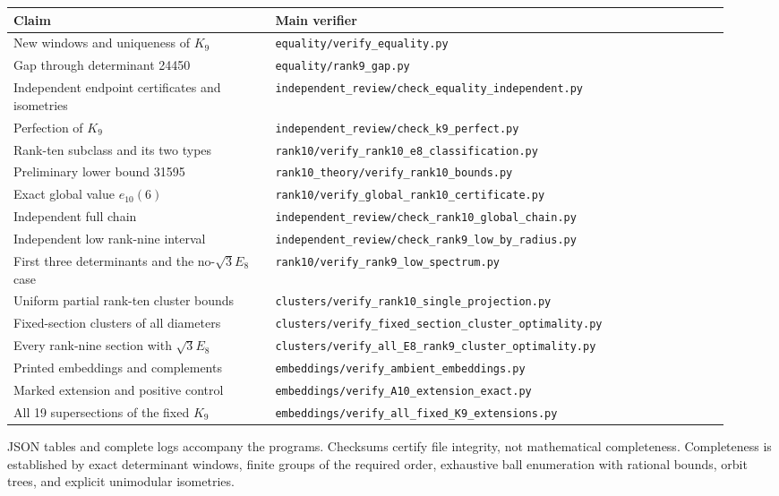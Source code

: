 \documentclass[11pt,a4paper]{article}
\theoremstyle{remark}\newtheorem{remark}[theorem]{Remark}
\newcommand{\file}[1]{{\small\nolinkurl{#1}}}
\begin{document}
\begin{longtable}{P{0.34\linewidth}P{0.59\linewidth}}
\toprule
Claim & Main verifier\\\midrule
\endhead
New windows and uniqueness of $K_9$ &\file{equality/verify_equality.py}\\[3pt]
Gap through determinant 24450 &\file{equality/rank9_gap.py}\\[3pt]
Independent endpoint certificates and isometries &\file{independent_review/check_equality_independent.py}\\[3pt]
Perfection of $K_9$ &\file{independent_review/check_k9_perfect.py}\\[3pt]
Rank-ten subclass and its two types &\file{rank10/verify_rank10_e8_classification.py}\\[3pt]
Preliminary lower bound 31595 &\file{rank10_theory/verify_rank10_bounds.py}\\[3pt]
Exact global value $e_{10}(6)$ &\file{rank10/verify_global_rank10_certificate.py}\\[3pt]
Independent full chain &\file{independent_review/check_rank10_global_chain.py}\\[3pt]
Independent low rank-nine interval &\file{independent_review/check_rank9_low_by_radius.py}\\[3pt]
First three determinants and the no-$\sqrt3E_8$ case &\file{rank10/verify_rank9_low_spectrum.py}\\[3pt]
Uniform partial rank-ten cluster bounds &\file{clusters/verify_rank10_single_projection.py}\\[3pt]
Fixed-section clusters of all diameters &\file{clusters/verify_fixed_section_cluster_optimality.py}\\[3pt]
Every rank-nine section with $\sqrt3E_8$ &\file{clusters/verify_all_E8_rank9_cluster_optimality.py}\\[3pt]
Printed embeddings and complements &\file{embeddings/verify_ambient_embeddings.py}\\[3pt]
Marked extension and positive control &\file{embeddings/verify_A10_extension_exact.py}\\
All 19 supersections of the fixed $K_9$ &\file{embeddings/verify_all_fixed_K9_extensions.py}\\
\bottomrule
\end{longtable}

JSON tables and complete logs accompany the programs. Checksums certify file integrity, not mathematical completeness. Completeness is established by exact determinant windows, finite groups of the required order, exhaustive ball enumeration with rational bounds, orbit trees, and explicit unimodular isometries.
\end{document}

